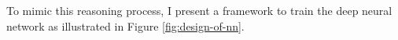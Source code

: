 \documentclass[12pt,letterpaper]{article}
\begin{document}
To mimic this reasoning process, I present a framework to train the deep neural network as illustrated in Figure \ref{fig:design-of-nn}.








% 

      
  
  

  
  
\end{document}
